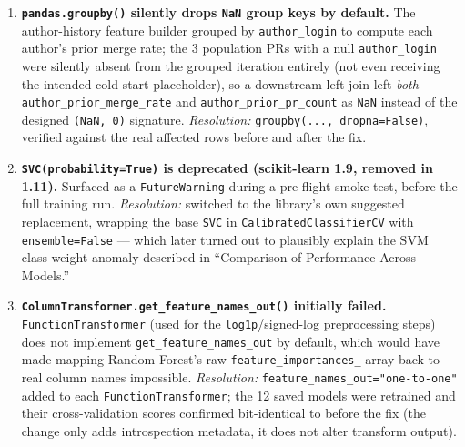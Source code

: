 \documentclass{experimentreport}
\begin{document}
{\begin{enumerate}
\item \textbf{\texttt{pandas.groupby()} silently drops \texttt{NaN} group keys by default.}
The author-history feature builder grouped by \texttt{author\_login} to compute each author's
prior merge rate; the 3 population PRs with a null \texttt{author\_login} were silently absent
from the grouped iteration entirely (not even receiving the intended cold-start placeholder), so a
downstream left-join left \emph{both} \texttt{author\_prior\_merge\_rate} and
\texttt{author\_prior\_pr\_count} as \texttt{NaN} instead of the designed \texttt{(NaN, 0)}
signature. \emph{Resolution:} \texttt{groupby(..., dropna=False)}, verified against the real
affected rows before and after the fix.

\item \textbf{\texttt{SVC(probability=True)} is deprecated (scikit-learn 1.9, removed in 1.11).}
Surfaced as a \texttt{FutureWarning} during a pre-flight smoke test, before the full training run.
\emph{Resolution:} switched to the library's own suggested replacement, wrapping the base
\texttt{SVC} in \texttt{CalibratedClassifierCV} with \texttt{ensemble=False} --- which later
turned out to plausibly explain the SVM class-weight anomaly described in ``Comparison of
Performance Across Models.''

\item \textbf{\texttt{ColumnTransformer.get\_feature\_names\_out()} initially failed.}
\texttt{FunctionTransformer} (used for the \texttt{log1p}/signed-log preprocessing steps) does not
implement \texttt{get\_feature\_names\_out} by default, which would have made mapping Random
Forest's raw \texttt{feature\_importances\_} array back to real column names impossible.
\emph{Resolution:} \texttt{feature\_names\_out="one-to-one"} added to each
\texttt{FunctionTransformer}; the 12 saved models were retrained and their cross-validation scores
confirmed bit-identical to before the fix (the change only adds introspection metadata, it does
not alter transform output).

\end{enumerate}

}

\end{document}
